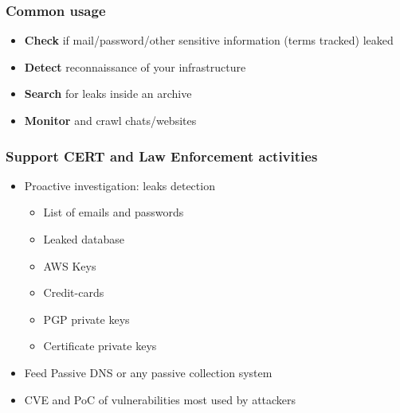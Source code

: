 \documentclass[aspectratio=169]{beamer}
\begin{document}
\begin{frame}
    \frametitle{Common usage}
        \begin{itemize}
                \item {\bf Check} if mail/password/other sensitive information (terms tracked) leaked
                \item {\bf Detect} reconnaissance of your infrastructure
                \item {\bf Search} for leaks inside an archive
                \item {\bf Monitor} and crawl chats/websites
        \end{itemize}
\end{frame}

\begin{frame}
    \frametitle{Support CERT and Law Enforcement activities}
        \begin{itemize}
            \item Proactive investigation: leaks detection
            \begin{itemize}
		        \item List of emails and passwords
		        \item Leaked database
		        \item AWS Keys
		        \item Credit-cards
		        \item PGP private keys
		        \item Certificate private keys
		    \end{itemize}
		    \item Feed Passive DNS or any passive collection system
		    \item CVE and PoC of vulnerabilities most used by attackers
		\end{itemize}
\end{frame}
\end{document}
